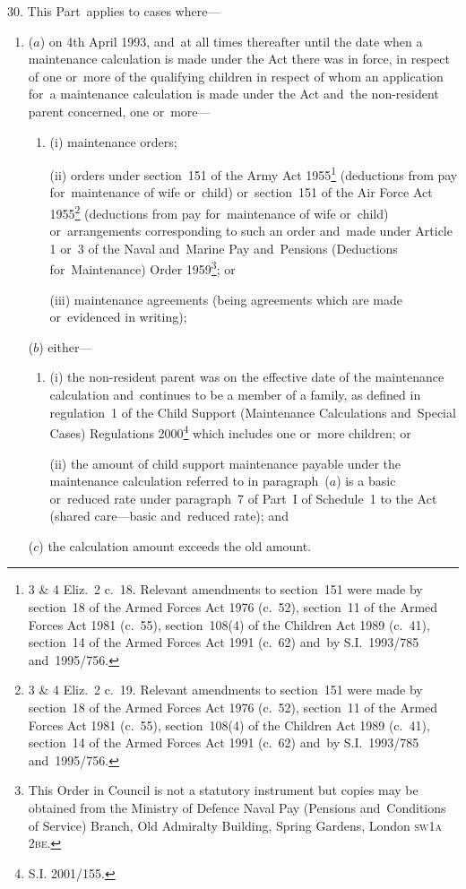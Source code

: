 \documentclass[12pt,a4paper]{article}
\begin{document}
30.  This Part~applies to cases where—
\begin{enumerate}\item[]
($a$) on 4th April 1993, and~at all times thereafter until the date when a maintenance calculation is made under the Act there was in force, in respect of one or~more of the qualifying children in respect of whom an application for~a maintenance calculation is made 
under the Act and~the non-resident parent concerned, one or~more—
\begin{enumerate}\item[]
(i) maintenance orders;

(ii) orders under section~151 of the Army Act 1955\footnote{3 \& 4 Eliz.\ 2 c.\ 18. Relevant amendments to section~151 were made by section~18 of the Armed Forces Act 1976 (c.\ 52), section~11 of the Armed Forces Act 1981 (c.\ 55), section~108(4) of the Children Act 1989 (c.\ 41), section~14 of the Armed Forces Act 1991 (c.\ 62) and~by S.I.~1993/785 and~1995/756.} (deductions from pay for~maintenance of wife or~child) or~section~151 of the Air Force Act 1955\footnote{3 \& 4 Eliz.\ 2 c.\ 19. Relevant amendments to section~151 were made by section~18 of the Armed Forces Act 1976 (c.\ 52), section~11 of the Armed Forces Act 1981 (c.\ 55), section~108(4) of the Children Act 1989 (c.\ 41), section~14 of the Armed Forces Act 1991 (c.\ 62) and~by S.I.~1993/785 and~1995/756.} (deductions from pay for~maintenance of wife or~child) or~arrangements corresponding to such an order and~made under Article 1 or~3 of the Naval and~Marine Pay and~Pensions (Deductions for~Maintenance) Order 1959\footnote{\frenchspacing This Order in Council is not a statutory instrument but copies may be obtained from the Ministry of Defence Naval Pay (Pensions and~Conditions of Service) Branch, Old Admiralty Building, Spring Gardens, London \textsc{\lowercase{SW1A 2BE}}.}; or

(iii) maintenance agreements (being agreements which are made or~evidenced in writing);
\end{enumerate}

($b$) either—
\begin{enumerate}\item[]
(i) the non-resident parent was on the effective date of the maintenance calculation and~continues to be a member of a family, as defined in regulation~1 of the Child Support (Maintenance Calculations and~Special Cases) Regulations 2000\footnote{\frenchspacing S.I. 2001/155.} which includes one or~more children; or

(ii) the amount of child support maintenance payable under the maintenance calculation referred to in paragraph~($a$)  is a basic or~reduced rate under paragraph~7 of Part~I of Schedule~1 to the Act (shared care—basic and~reduced rate); and
\end{enumerate}

($c$) the calculation amount exceeds the old amount.
\end{enumerate}
\end{document}
